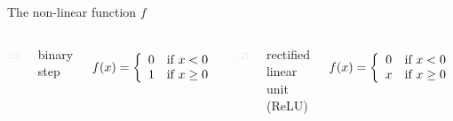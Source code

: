 \documentclass[aspectratio=169]{beamer}
\begin{document}
\begin{frame}{The non-linear function $f$}
\small
\vspace{0.5cm}
\begin{columns}
\includegraphics[width=\linewidth]{Activation_binary_step.pdf}

binary step

\vspace{-\baselineskip}
\[ f(x) = \left\{ \begin{array}{c l}
0 & \text{if } x < 0 \\
1 & \text{if } x \ge 0 \\
\end{array} \right. \]

\includegraphics[width=\linewidth]{Activation_rectified_linear.pdf}

rectified linear unit (ReLU)

\vspace{-\baselineskip}
\[ f(x) = \left\{ \begin{array}{c l}
0 & \text{if } x < 0 \\
x & \text{if } x \ge 0 \\
\end{array} \right. \]
\end{columns}


\end{frame}
\end{document}
